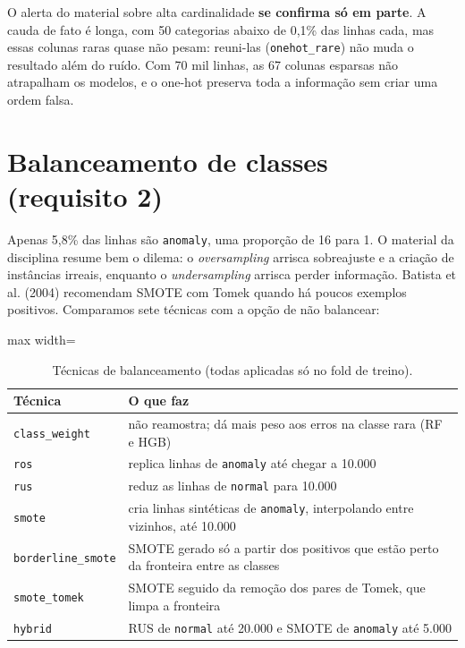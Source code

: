 \documentclass[11pt,a4paper]{article}
\begin{document}
O alerta do material sobre alta cardinalidade \textbf{se confirma só em parte}. A cauda de fato é longa, com 50 categorias abaixo de 0,1\% das linhas cada, mas essas colunas raras quase não pesam: reuni-las (\texttt{onehot\_rare}) não muda o resultado além do ruído. Com 70 mil linhas, as 67 colunas esparsas não atrapalham os modelos, e o one-hot preserva toda a informação sem criar uma ordem falsa.

\section{Balanceamento de classes (requisito 2)}

Apenas 5,8\% das linhas são \texttt{anomaly}, uma proporção de 16 para 1. O material da disciplina resume bem o dilema: o \emph{oversampling} arrisca sobreajuste e a criação de instâncias irreais, enquanto o \emph{undersampling} arrisca perder informação. Batista et al. (2004) recomendam SMOTE com Tomek quando há poucos exemplos positivos. Comparamos sete técnicas com a opção de não balancear:

\begin{table}[H]
\centering
\caption{Técnicas de balanceamento (todas aplicadas só no fold de treino).}
\begin{adjustbox}{max width=\linewidth}
\begin{tabular}{lp{11cm}}
\toprule
Técnica & O que faz \\
\midrule
\texttt{class\_weight} & não reamostra; dá mais peso aos erros na classe rara (RF e HGB) \\
\texttt{ros} & replica linhas de \texttt{anomaly} até chegar a 10.000 \\
\texttt{rus} & reduz as linhas de \texttt{normal} para 10.000 \\
\texttt{smote} & cria linhas sintéticas de \texttt{anomaly}, interpolando entre vizinhos, até 10.000 \\
\texttt{borderline\_smote} & SMOTE gerado só a partir dos positivos que estão perto da fronteira entre as classes \\
\texttt{smote\_tomek} & SMOTE seguido da remoção dos pares de Tomek, que limpa a fronteira \\
\texttt{hybrid} & RUS de \texttt{normal} até 20.000 e SMOTE de \texttt{anomaly} até 5.000 \\
\bottomrule
\end{tabular}
\end{adjustbox}
\end{table}
\end{document}
